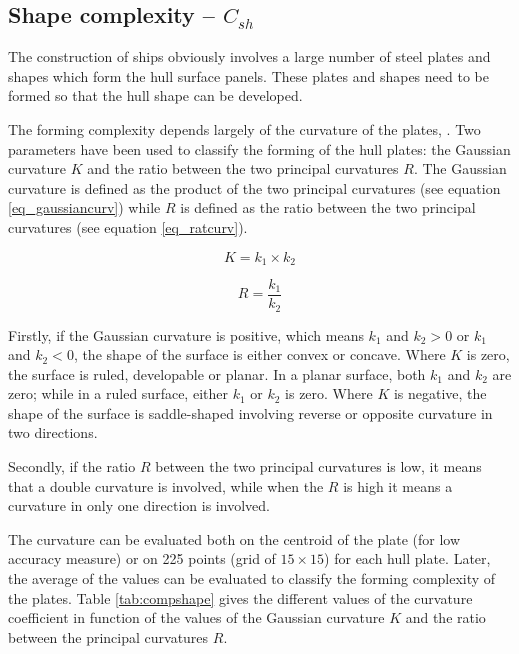 \subsection{Shape complexity -- $C_{sh}$}
The construction of ships obviously involves a large number of steel plates and shapes which form the hull surface panels. These plates and shapes need to be formed so that the hull shape can be developed.


The forming complexity depends largely of the curvature of the plates, \cite{parsons1999scalar}. Two parameters have been used to classify the forming of the hull plates: the Gaussian curvature $K$ and the ratio between the two principal curvatures $R$. The Gaussian curvature is defined as the product of the two principal curvatures (see equation \ref{eq_gaussiancurv}) while $R$ is defined as the ratio between the two principal curvatures (see equation \ref{eq_ratcurv}).
	
\begin{equation}
\label{eq_gaussiancurv}
K = k_1 \times k_2
\end{equation}
	
\begin{equation}
\label{eq_ratcurv}
R = \frac{k_1}{k_2}
\end{equation}
	
Firstly, if the Gaussian curvature is positive, which means $k_1$ and $k_2 > 0$ or $k_1$ and $k_2 < 0$, the shape of the surface is either convex or concave. Where $K$ is zero, the surface is ruled, developable or planar. In a planar surface, both $k_1$ and $k_2$ are zero; while in a ruled surface, either $k_1$ or $k_2$ is zero. Where $K$ is negative, the shape of the surface is saddle-shaped involving reverse or opposite curvature in two directions.


Secondly, if the ratio $R$ between the two principal curvatures is low, it means that a double curvature is involved, while when the $R$ is high it means a curvature in only one direction is involved.


The curvature can be evaluated both on the centroid of the plate (for low accuracy measure) or on 225 points (grid of $15 \times 15$) for each hull plate. Later, the average of the values can be evaluated to classify the forming complexity of the plates. Table \ref{tab:compshape} gives the different values of the curvature coefficient in function of the values of the Gaussian curvature $K$ and the ratio between the principal curvatures $R$.


